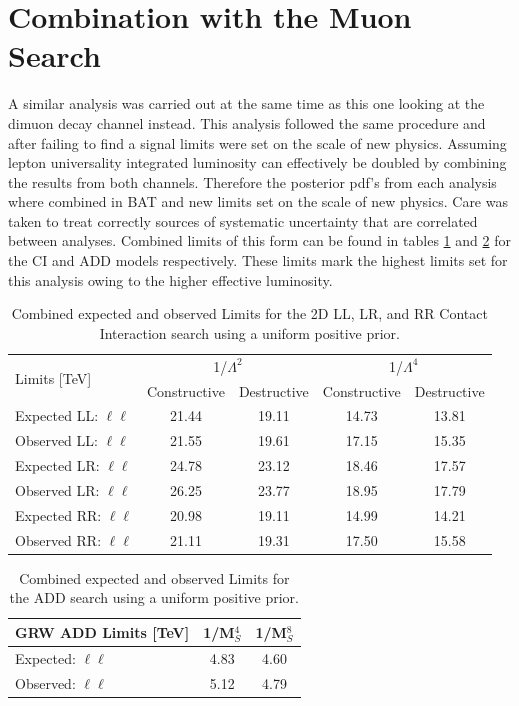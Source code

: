 \section{Combination with the Muon Search}

    A similar analysis was carried out at the same time as this one looking at the dimuon decay channel instead. This analysis followed the same procedure and after failing to find a signal limits were set on the scale of new physics. Assuming lepton universality integrated luminosity can effectively be doubled by combining the results from both channels. Therefore the posterior pdf's from each analysis where combined in BAT and new limits set on the scale of new physics. Care was taken to treat correctly sources of systematic uncertainty that are correlated between analyses. Combined limits of this form can be found in tables \ref{tab:Comb_Limits_CI} and \ref{tab:Comb_Limits_ADD} for the CI and ADD models respectively. These limits mark the highest limits set for this analysis owing to the higher effective luminosity. 


\begin{table}[p]
\centering
\begin{tabular}{ l|c|c|c|c }
    \hline
    \hline
    \multirow{2}{*}{Limits [TeV]} & \multicolumn{2}{c|}{1/$\Lambda^2$} & \multicolumn{2}{c}{1/$\Lambda^4$} \\
    \cline{2-5}
     & Constructive & Destructive & Constructive & Destructive \\
    \hline
    Expected LL: $\ell\ell$ & 21.44 & 19.11 & 14.73 & 13.81 \\
    Observed LL: $\ell\ell$  & 21.55 & 19.61 & 17.15 & 15.35 \\
    \hline
    Expected LR: $\ell\ell$ & 24.78 & 23.12 & 18.46 & 17.57 \\
    Observed LR: $\ell\ell$ & 26.25 & 23.77 & 18.95 & 17.79 \\
    \hline
    Expected RR: $\ell\ell$ & 20.98 & 19.11 & 14.99 & 14.21 \\
    Observed RR: $\ell\ell$ & 21.11 & 19.31 & 17.50 & 15.58 \\
    \hline
    \hline
\end{tabular}
\caption{Combined expected and observed Limits for the 2D LL, LR, and RR Contact Interaction search using a uniform positive prior.}
\label{tab:Comb_Limits_CI}
\end{table}


\begin{table}[p]
\centering
\begin{tabular}{ l | c | c }
    \hline
    \hline
    GRW ADD Limits [TeV] & 1/M$_S^4$ & 1/M$_S^8$ \\
    \hline
    Expected: $\ell\ell$ & 4.83 & 4.60 \\
    Observed: $\ell\ell$ & 5.12 & 4.79 \\
    \hline
    \hline
\end{tabular}
\caption{Combined expected and observed Limits for the ADD search using a uniform positive prior.}
\label{tab:Comb_Limits_ADD}
\end{table}




